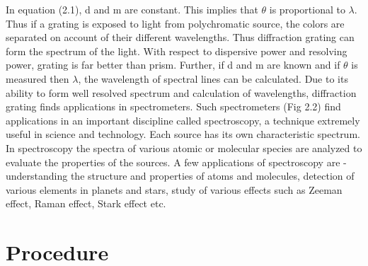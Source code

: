 \documentclass[11pt]{article}
\begin{document}
	In equation (2.1), d and m are constant. This implies that $\theta$ is proportional to $\lambda$. Thus if a grating
	is exposed to light from polychromatic source, the colors are separated on account of their
	different wavelengths. Thus diffraction grating can form the spectrum of the light. With respect
	to dispersive power and resolving power, grating is far better than prism. Further, if d and m are
	known and if $\theta$ is measured then $\lambda$, the wavelength of spectral lines can be calculated. Due to its
	ability to form well resolved spectrum and calculation of wavelengths, diffraction grating finds
	applications in spectrometers. Such spectrometers (Fig 2.2) find applications in an important
	discipline called spectroscopy, a technique extremely useful in science and technology. Each
	source has its own characteristic spectrum. In spectroscopy the spectra of various atomic or
	molecular species are analyzed to evaluate the properties of the sources. A few applications of
	spectroscopy are - understanding the structure and properties of atoms and molecules, detection
	of various elements in planets and stars, study of various effects such as Zeeman effect, Raman
	effect, Stark effect etc.
	
	\section{Procedure}
	
\end{document}
